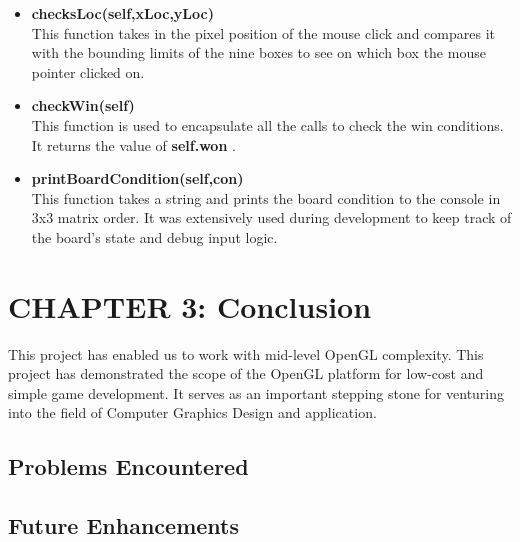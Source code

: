 \documentclass[12pt]{article}
\begin{document}
\begin{itemize}
    \item \textbf{checksLoc(self,xLoc,yLoc)}\\ This function takes in the pixel position of the mouse click and compares it with the bounding limits of the nine boxes to see on which box the mouse pointer clicked on.
    \item \textbf{checkWin(self)}\\ This function is used to encapsulate all the calls to check the win conditions. It returns the value of \textbf{self.won} .
    \item \textbf{printBoardCondition(self,con)}\\ This function takes a string and prints the board condition to the console in 3x3 matrix order. It was extensively used during development to keep track of the board's state and debug input logic.
\end{itemize}


\section{CHAPTER 3: Conclusion}
This project has enabled us to work with mid-level OpenGL complexity. This project has demonstrated the scope of the OpenGL platform for low-cost and simple game development. It serves as an important stepping stone for venturing into the field of Computer Graphics Design and application.
\subsection{Problems Encountered}

\subsection{Future Enhancements}


\clearpage
\thispagestyle{empty}
\printbibliography
\end{document}

